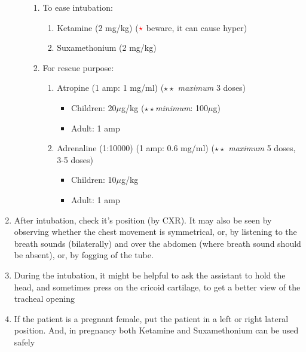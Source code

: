 \documentclass[11pt,a4paper]{report}
\begin{document}
\begin{enumerate}
\begin{enumerate}
\begin{enumerate}
			\item To ease intubation: 
			\begin{enumerate}
				\item Ketamine (2 mg/kg) (${\color{red}\star}$ beware, it can cause hyper)
				\item Suxamethonium (2 mg/kg)
			\end{enumerate}
			\item For rescue purpose: 
			\begin{enumerate}
				\item Atropine (1 amp: 1 mg/ml)
				({\color{red}$\star\star$} \textit{maximum} 3 doses)
				\begin{itemize}
					\item Children: 20$\mu$g/kg ({\color{red}$\star\star$}\textit{minimum}: 100$\mu$g)
					\item Adult: 1 amp
				\end{itemize}
				\item Adrenaline (1:10000) (1 amp: 0.6 mg/ml) 
				({\color{red}$\star\star$} \textit{maximum} 5 doses, 3-5 doses)
				\begin{itemize}
					\item Children: 10$\mu$g/kg
					\item Adult: 1 amp 
				\end{itemize}
			\end{enumerate}
		\end{enumerate}
	\end{enumerate}
	\item After intubation, check it's position (by CXR). It may also be seen by observing whether the chest movement is symmetrical, or, by listening to the breath sounds (bilaterally) and over the abdomen (where breath sound should be absent), or, by fogging of the tube. 
	\item During the intubation, it might be helpful to ask the assistant to hold the head, and sometimes press on the cricoid cartilage, to get a better view of the tracheal opening
	\item If the patient is a pregnant female, put the patient in a left or right lateral position. And, in pregnancy both Ketamine and Suxamethonium can be used safely
\end{enumerate}

\newpage
\end{document}
